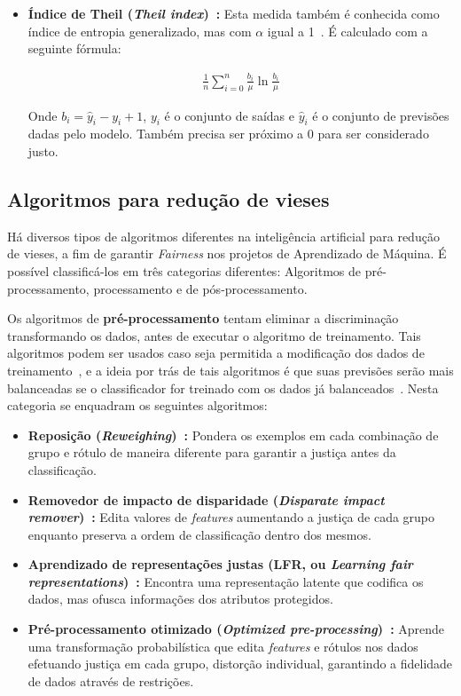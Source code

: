 \documentclass[portugues]{ic-tese}
\begin{document}
\begin{itemize}
\item \textbf{Índice de Theil (\textit{Theil index})~\citep{Speicher_2018}:} Esta medida também é conhecida como índice de entropia generalizado, mas com $\alpha$ igual a 1~\citep{Speicher_2018}. É calculado com a seguinte fórmula:

\begin{align*}
\frac{1}{n}\sum^{n}_{i=0}\frac{b_i}{\mu}\ln{\frac{b_i}{\mu}}
\end{align*}

Onde $b_i = \hat{y}_i - y_i + 1$, $y_i$ é o conjunto de saídas e $\hat{y}_i$ é o conjunto de previsões dadas pelo modelo. Também precisa ser próximo a 0 para ser considerado justo.

\end{itemize}

\subsection{Algoritmos para redução de vieses}

Há diversos tipos de algoritmos diferentes na inteligência artificial para redução de vieses, a fim de garantir \textit{Fairness} nos projetos de Aprendizado de Máquina. É possível classificá-los em três categorias diferentes: Algoritmos de pré-processamento, processamento e de pós-processamento.

Os algoritmos de \textbf{pré-processamento} tentam eliminar a discriminação transformando os dados, antes de executar o algoritmo de treinamento. Tais algoritmos podem ser usados caso seja permitida a modificação dos dados de treinamento~\citep{dAlessandro_2017}, e a ideia por trás de tais algoritmos é que suas previsões serão mais balanceadas se o classificador for treinado com os dados já balanceados~\citep{Kamiran_2009}. Nesta categoria se enquadram os seguintes algoritmos:

\begin{itemize}
\item \textbf{Reposição (\textit{Reweighing})~\citep{Kamiran_2011}:} Pondera os exemplos em cada combinação de grupo e rótulo de maneira diferente para garantir a justiça antes da classificação.

\item \textbf{Removedor de impacto de disparidade (\textit{Disparate impact remover})~\citep{Feldman_2015}:} Edita valores de \textit{features} aumentando a justiça de cada grupo enquanto preserva a ordem de classificação dentro dos mesmos.

\item \textbf{Aprendizado de representações justas (LFR, ou \textit{Learning fair representations})~\citep{Zemel_2013}:} Encontra uma representação latente que codifica os dados, mas ofusca informações dos atributos protegidos.

\item \textbf{Pré-processamento otimizado (\textit{Optimized pre-processing})~\citep{Calmon_2017}:} Aprende uma transformação probabilística que edita \textit{features} e rótulos nos dados efetuando justiça em cada grupo, distorção individual, garantindo a fidelidade de dados através de restrições.
\end{itemize}
\end{document}
